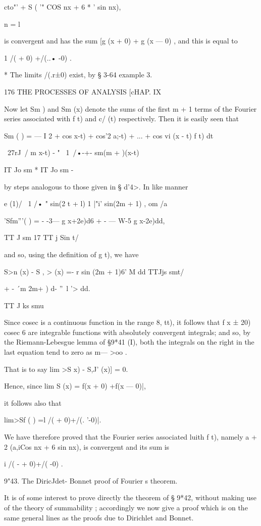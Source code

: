   cto"' + S ( '" COS nx + 6 * ' sin nx),

n = l

is convergent and has the sum [g (x + 0) + g (x — 0) , and this is
equal to

1 /( + 0) +/(..• -0) .

* The limits /(.r±0) exist, by § 3-64 example 3.

176 THE PROCESSES OF ANALYSIS [cHAP. IX

Now let Sm ) and Sm (x) denote the sums of the first m + 1 terms of
the Fourier series associated with f t) and c/ (t) respectively. Then
it is easily seen that

Sm ( ) = — I 2 + cos x-t) + cos'2 a;-t) + ... + cos vi (x - t) f t) dt

~27rJ\ / m x-t) - " \ 1\ /•-+- sm(m + )(x-t)

IT Jo sm * IT Jo sm -

by steps analogous to those given in § d'4>. In like manner

e (1)/ \ 1 /• " sin(2 t + l) 1 |"i' sin(2m + 1) , om /a

'Sfm'''( ) = - -3— g x+2e)d6 + - — W-5 g x-2e)dd,

TT J sm 17 TT j Sin t/

and so, using the definition of g t), we have

S>n (x) - S , > (x) =- r sin (2m + 1)6' M dd TTJjs smt/

+ - \'\ m 2m+ ) d- ''~l '> dd.

TT J ks smu

Since cosec is a continuous function in the range 8, tt), it follows
that f x ± 20) cosec 6 are integrable functions with absolutely
convergent integrals; and so, by the Riemann-Lebesgue lemma of §9*41
(I), both the integrals on the right in the last equation tend to zero
as m— >oo .

That is to say lim >S x) - S,J' (x)] = 0.

Hence, since lim S (x) = f(x + 0) +f(x — 0)|,

it follows also that

lim>Sf ( ) =l /( + 0)+/(. '-0)|.

We have therefore proved that the Fourier series associated luith f
t), namely a + 2 (a,iCos nx + 6 sin nx), is convergent and its sum is

i /( - + 0)+/( -0) .

9"43. The DiricJdet- Bonnet proof of Fourier s theorem.

It is of some interest to prove directly the theorem of § 9*42,
without making use of the theory of summability ; accordingly we now
give a proof which is on the same general lines as the proofs due to
Dirichlet and Bonnet.

